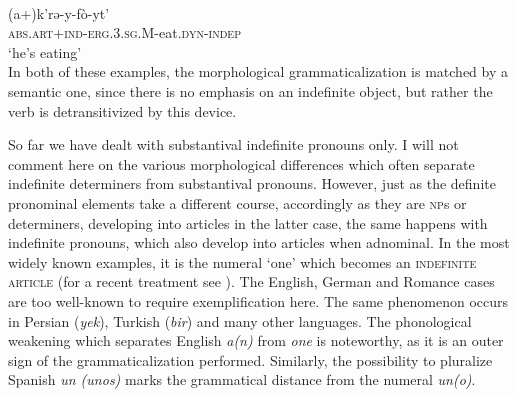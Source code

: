 \ea\label{ex:E23}
\\
\gll (a+)k'rə-y-fò-yt'\\
 \textsc{abs}.\textsc{art}+\textsc{ind}-\textsc{erg}.3.\textsc{sg}.M-eat.\textsc{dyn}-\textsc{indep}\\
\glt ‘he's eating’ \\
\z
\noindent In both of these examples, the morphological grammaticalization is matched by a semantic one, since there is no emphasis on an indefinite object, but rather the verb is detransitivized by this device.

So far we have dealt with substantival indefinite pronouns only. I will not comment here on the various morphological differences which often separate indefinite determiners from substantival pronouns. However, just as the definite pronominal elements take a different course, accordingly as they are \textsc{np}s or determiners, developing into articles in the latter case, the same happens with indefinite pronouns, which also develop into articles when adnominal. In the most widely known examples, it is the numeral ‘one’ which becomes an \textsc{indefinite article} (for a recent treatment see \citealt{Givón1981}). The English, German and Romance cases are too well-known to require exemplification here. The same phenomenon occurs in Persian (\textit{yek}), Turkish (\textit{bir}) and many other languages. The phonological weakening which separates English \textit{a(n)} from \textit{one} is noteworthy, as it is an outer sign of the grammaticalization performed. Similarly, the possibility to pluralize Spanish \textit{un (unos)} marks the grammatical distance from the numeral \textit{un(o)}.

